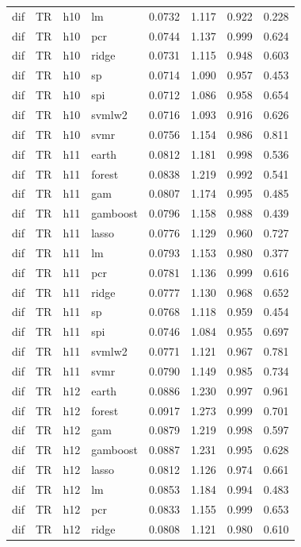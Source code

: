 \begin{ThreePartTable}
\begin{longtable}[t]{llclcccc}
dif & TR & h10 & lm & 0.0732 & 1.117 & 0.922 & 0.228\\
dif & TR & h10 & pcr & 0.0744 & 1.137 & 0.999 & 0.624\\
dif & TR & h10 & ridge & 0.0731 & 1.115 & 0.948 & 0.603\\
dif & TR & h10 & sp & 0.0714 & 1.090 & 0.957 & 0.453\\
dif & TR & h10 & spi & 0.0712 & 1.086 & 0.958 & 0.654\\
dif & TR & h10 & svmlw2 & 0.0716 & 1.093 & 0.916 & 0.626\\
dif & TR & h10 & svmr & 0.0756 & 1.154 & 0.986 & 0.811\\
\addlinespace
dif & TR & h11 & earth & 0.0812 & 1.181 & 0.998 & 0.536\\
dif & TR & h11 & forest & 0.0838 & 1.219 & 0.992 & 0.541\\
dif & TR & h11 & gam & 0.0807 & 1.174 & 0.995 & 0.485\\
dif & TR & h11 & gamboost & 0.0796 & 1.158 & 0.988 & 0.439\\
dif & TR & h11 & lasso & 0.0776 & 1.129 & 0.960 & 0.727\\
dif & TR & h11 & lm & 0.0793 & 1.153 & 0.980 & 0.377\\
dif & TR & h11 & pcr & 0.0781 & 1.136 & 0.999 & 0.616\\
dif & TR & h11 & ridge & 0.0777 & 1.130 & 0.968 & 0.652\\
dif & TR & h11 & sp & 0.0768 & 1.118 & 0.959 & 0.454\\
dif & TR & h11 & spi & 0.0746 & 1.084 & 0.955 & 0.697\\
dif & TR & h11 & svmlw2 & 0.0771 & 1.121 & 0.967 & 0.781\\
dif & TR & h11 & svmr & 0.0790 & 1.149 & 0.985 & 0.734\\
\addlinespace
dif & TR & h12 & earth & 0.0886 & 1.230 & 0.997 & 0.961\\
dif & TR & h12 & forest & 0.0917 & 1.273 & 0.999 & 0.701\\
dif & TR & h12 & gam & 0.0879 & 1.219 & 0.998 & 0.597\\
dif & TR & h12 & gamboost & 0.0887 & 1.231 & 0.995 & 0.628\\
dif & TR & h12 & lasso & 0.0812 & 1.126 & 0.974 & 0.661\\
dif & TR & h12 & lm & 0.0853 & 1.184 & 0.994 & 0.483\\
dif & TR & h12 & pcr & 0.0833 & 1.155 & 0.999 & 0.653\\
dif & TR & h12 & ridge & 0.0808 & 1.121 & 0.980 & 0.610\\

\end{longtable}
\end{ThreePartTable}
